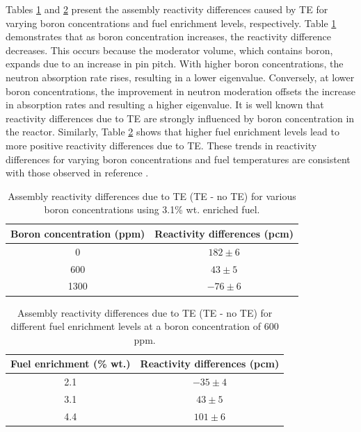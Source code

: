 Tables \ref{tab421} and \ref{tab422} present the assembly reactivity differences caused by TE for varying boron concentrations and fuel enrichment levels, respectively. Table \ref{tab421} demonstrates that as boron concentration increases, the reactivity difference decreases. This occurs because the moderator volume, which contains boron, expands due to an increase in pin pitch. With higher boron concentrations, the neutron absorption rate rises, resulting in a lower eigenvalue. Conversely, at lower boron concentrations, the improvement in neutron moderation offsets the increase in absorption rates and resulting a higher eigenvalue. It is well known that reactivity differences due to TE are strongly influenced by boron concentration in the reactor. Similarly, Table \ref{tab422} shows that higher fuel enrichment levels lead to more positive reactivity differences due to TE. These trends in reactivity differences for varying boron concentrations and fuel temperatures are consistent with those observed in reference \cite{palmtag}.

\begin{table}
    \centering
    \caption[Assembly reactivity differences for various boron concentrations.]{Assembly reactivity differences due to TE (TE - no TE) for various boron concentrations using 3.1\% wt. enriched fuel.}
    \label{tab421} 
    \begin{tabular}{| c | c |}
    \hline 
     Boron concentration (ppm) & Reactivity differences (pcm) \\
     \hline
     0        & $182\pm6$     \\ \hline
     600      & $43\pm5$     \\ \hline
     1300     & $-76\pm6$    \\ \hline
    \end{tabular}
\end{table}

\begin{table}
    \centering
    \caption[Assembly reactivity differences for different fuel enrichments.]{Assembly reactivity differences due to TE (TE - no TE) for different fuel enrichment levels at a boron concentration of 600 ppm.}
    \label{tab422} 
    \begin{tabular}{| c | c |}
    \hline 
    Fuel enrichment (\% wt.) & Reactivity differences (pcm) \\
     \hline
     2.1        & $-35\pm4$    \\ \hline
     3.1        & $43\pm5$     \\ \hline
     4.4        & $101\pm6$    \\ \hline
    \end{tabular}
\end{table}

